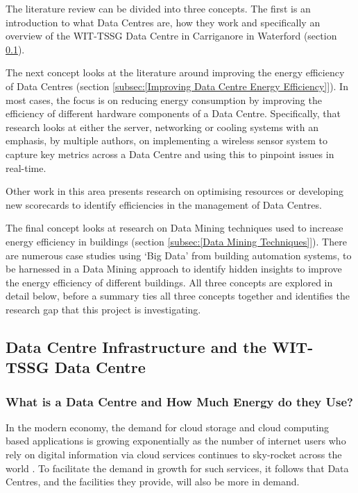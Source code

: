 \documentclass[12pt]{scrartcl}
\begin{document}
The literature review can be divided into three concepts. The first is an introduction to what Data Centres are, how they work and specifically an overview of the WIT-TSSG Data Centre in Carriganore in Waterford (section \ref{subsec:[Data Centre Infrastructure and the WIT-TSSG Data Centre]}).  

The next concept looks at the literature around improving the energy efficiency of Data Centres (section \ref{subsec:[Improving Data Centre Energy Efficiency]}). In most cases, the focus is on reducing energy consumption by improving the efficiency of different hardware components of a Data Centre. Specifically, that research looks at either the server, networking or cooling systems with an emphasis, by multiple authors, on implementing a wireless sensor system to capture key metrics across a Data Centre and using this to pinpoint issues in real-time. 

Other work in this area presents research on optimising resources or developing new scorecards to identify efficiencies in the management of Data Centres. 

The final concept looks at research on Data Mining techniques used to increase energy efficiency in buildings (section \ref{subsec:[Data Mining Techniques]}). There are numerous case studies using `Big Data' from building automation systems, to be harnessed in a Data Mining approach to identify hidden insights to improve the energy efficiency of different buildings. All three concepts are explored in detail below, before a summary ties all three concepts together and identifies the research gap that this project is investigating.        

\subsection{Data Centre Infrastructure and the WIT-TSSG Data Centre}
\label{subsec:[Data Centre Infrastructure and the WIT-TSSG Data Centre]}

\subsubsection{What is a Data Centre and How Much Energy do they Use?}
\label{subsubsec:[What is a Data Centre and How Much Energy do they Use?]}

In the modern economy, the demand for cloud storage and cloud computing based applications is growing exponentially as the number of internet users who rely on digital information via cloud services continues to sky-rocket across the world \citep{VASUDEVAN201794}. To facilitate the demand in growth for such services, it follows that Data Centres, and the facilities they provide, will also be more in demand.  
\end{document}
